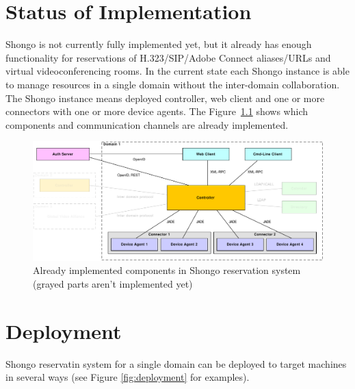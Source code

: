 \chapter{Status of Implementation}

Shongo is not currently fully implemented yet, but it already has enough functionality for reservations of H.323/SIP/Adobe Connect aliases/URLs and virtual videoconferencing rooms. In the current state each Shongo instance is able to manage resources in a single domain without the inter-domain collaboration. The Shongo instance means deployed controller, web client and one or more connectors with one or more device agents. The Figure~\ref{fig:architecture-implemented} shows which components and communication channels are already implemented.

\begin{figure}[ht!]
\includegraphics[width=\textwidth]{diagrams/dd_architecture_implemented}
\caption{Already implemented components in Shongo reservation system (grayed parts aren't implemented yet)}
\label{fig:architecture-implemented}
\end{figure}




\chapter{Deployment}

Shongo reservatin system for a single domain can be deployed to target machines in several ways (see Figure \ref{fig:deployment} for examples).

